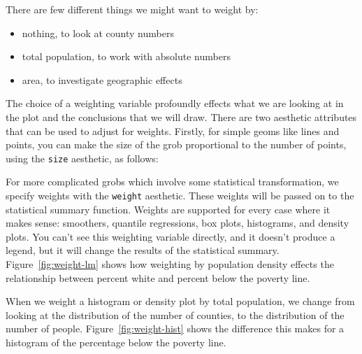 There are few different things we might want to weight by: 

\begin{itemize}
  \item nothing, to look at county numbers
  \item total population, to work with absolute numbers
  \item area, to investigate geographic effects
\end{itemize}

\noindent The choice of a weighting variable profoundly effects what we are looking at in the plot and the conclusions that we will draw.  There are two aesthetic attributes that can be used to adjust for weights.  Firstly, for simple geoms like lines and points, you can make the size of the grob proportional to the number of points, using the {\tt size} aesthetic, as follows:

%


For more complicated grobs which involve some statistical transformation, we specify weights with the {\tt weight} aesthetic.  These weights will be passed on to the statistical summary function.  Weights are supported for every case where it makes sense: smoothers, quantile regressions, box plots, histograms, and density plots.  You can't see this weighting variable directly, and it doesn't produce a legend, but it will change the results of the statistical summary.  Figure~\ref{fig:weight-lm} shows how weighting by population density effects the relationship between percent white and percent below the poverty line.

%


When we weight a histogram or density plot by total population, we change from looking at the distribution of the number of counties, to the distribution of the number of people.  Figure~\ref{fig:weight-hist} shows the difference this makes for a histogram of the percentage below the poverty line.

%



